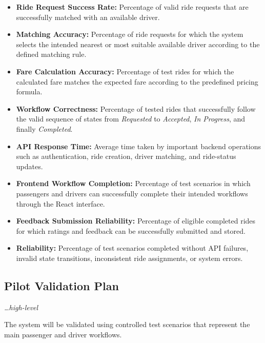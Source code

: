 \documentclass[11pt,a4paper]{article}
\newcommand{\BvrHint}[1]{%
  {\normalfont\normalsize\itshape\hfill #1}}
\begin{document}
\begin{itemize}

    \item \textbf{Ride Request Success Rate:} Percentage of valid
    ride requests that are successfully matched with an available
    driver.

    \item \textbf{Matching Accuracy:} Percentage of ride requests
    for which the system selects the intended nearest or most
    suitable available driver according to the defined matching rule.

    \item \textbf{Fare Calculation Accuracy:} Percentage of test
    rides for which the calculated fare matches the expected fare
    according to the predefined pricing formula.

    \item \textbf{Workflow Correctness:} Percentage of tested rides
    that successfully follow the valid sequence of states from
    \textit{Requested} to \textit{Accepted}, \textit{In Progress},
    and finally \textit{Completed}.

    \item \textbf{API Response Time:} Average time taken by important
    backend operations such as authentication, ride creation,
    driver matching, and ride-status updates.

    \item \textbf{Frontend Workflow Completion:} Percentage of test
    scenarios in which passengers and drivers can successfully
    complete their intended workflows through the React interface.

    \item \textbf{Feedback Submission Reliability:} Percentage of
    eligible completed rides for which ratings and feedback can be
    successfully submitted and stored.

    \item \textbf{Reliability:} Percentage of test scenarios
    completed without API failures, invalid state transitions,
    inconsistent ride assignments, or system errors.

\end{itemize}


\subsection{Pilot Validation Plan}
\BvrHint{\ldots high-level}

The system will be validated using controlled test scenarios that
represent the main passenger and driver workflows.
\end{document}

